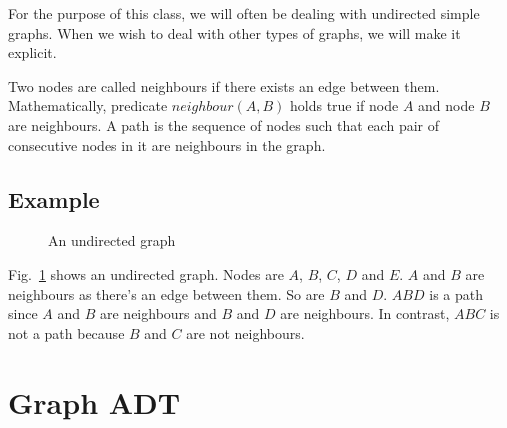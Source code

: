 \documentclass[12pt,a4paper]{article}
\begin{document}
For the purpose of this class, we will often be dealing with undirected simple graphs. When we wish to deal with other types of graphs, we will make it explicit.

Two nodes are called neighbours if there exists an edge between them. Mathematically, predicate $neighbour(A,B)$ holds true if node $A$ and node $B$ are neighbours. A path is the sequence of nodes such that each pair of consecutive nodes in it are neighbours in the graph.
 
\subsection*{Example}
\begin{figure}[H]
\begin{center}
\end{center}
\caption{An undirected graph}
\label{f:ug}
\end{figure}

Fig.~\ref{f:ug} shows an undirected graph. Nodes are $A$, $B$, $C$, $D$ and $E$. $A$ and $B$ are neighbours as there's an edge between them. So are $B$ and $D$.
$ABD$ is a path since $A$ and $B$ are neighbours and $B$ and $D$ are neighbours. In contrast, $ABC$ is not a path because $B$ and $C$ are not neighbours.

\section{Graph ADT}
\end{document}
